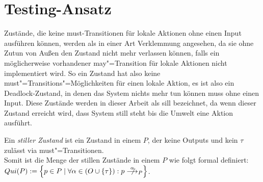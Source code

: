 \section{Testing-Ansatz}

Zustände, die keine must-Transitionen für lokale Aktionen ohne einen Input
ausführen können, werden als in einer Art Verklemmung angesehen, da sie ohne
Zutun von Außen den Zustand nicht mehr verlassen können, falls ein
möglicherweise vorhandener may"=Transition für lokale Aktionen nicht
implementiert wird. So ein Zustand hat also keine
must"=Transitions"=Möglichkeiten für einen lokale Aktion, es ist also ein
Deadlock-Zustand, in denen das System nichts mehr tun können muss ohne einen
Input. Diese Zustände werden in dieser Arbeit als sill bezeichnet, da wenn
dieser Zustand erreicht wird, dass System still steht bis die Umwelt eine
Aktion ausführt.

\begin{Def}[Stillstand]
  Ein \emph{stiller Zustand} ist ein Zustand in einem \MEIO{} $P$, der keine
  Outputs und kein $\tau$ zulässt via must"=Transitionen.\\
  Somit ist die Menge der stillen Zustände in einem \MEIO{} $P$ wie folgt
  formal definiert: $Qui(P):=\left\{p\in P\mid \forall\alpha\in
  (O\cup\{\tau\}):p \nmust[\alpha]_P\right\}$.
\end{Def}

